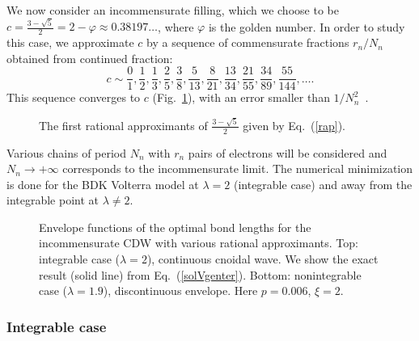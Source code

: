 \documentclass[]{revtex4-1}
\begin{document}
We now consider an incommensurate filling, which we choose to be  $c=\frac{3-\sqrt{5}}{2}=2-\varphi \approx 0.38197\dots$, where $\varphi$ is the golden number. In order to study this case, we 
approximate $c$ by a sequence of commensurate fractions $r_n/N_n$ obtained from continued fraction:
\begin{equation} c \sim \frac{0}{1}, \frac{1}{2}, \frac{1}{3}, \frac{2}{5}, \frac{3}{8}, \frac{5}{13}, \frac{8}{21}, \frac{13}{34}, \frac{21}{55}, \frac{34}{89}, \frac{55}{144}, \dots.
  \label{rap}
\end{equation}
This sequence converges to $c$ (Fig.~\ref{approx}), with an error smaller than $1/N_n^2$~\cite{diophantine}. 
\begin{figure}[t]
       \begin{center} 
\end{center} \caption{The first rational approximants of $\frac{3-\sqrt{5}}{2}$ given by Eq.~(\ref{rap}).}
  \label{approx}
\end{figure}
Various chains of period $N_n$ with $r_n$ pairs of electrons will be considered and $N_n \rightarrow +\infty$ corresponds to the incommensurate limit.
The numerical minimization is done for the BDK Volterra model at $\lambda=2$ (integrable case) and away from the integrable point at $\lambda \neq 2$.

\begin{figure}[t]
  \begin{center}
  \end{center}  \caption{Envelope functions of the optimal bond lengths for the incommensurate CDW with various rational approximants. Top: integrable case ($\lambda=2$), continuous cnoidal wave. We show the exact result (solid line) from Eq.~(\ref{solVgenter}). Bottom: nonintegrable case ($\lambda=1.9$), discontinuous envelope. Here $p=0.006$, $\xi=2$. }
  \label{envVint}
\end{figure}

\subsubsection{Integrable case}
\end{document}
